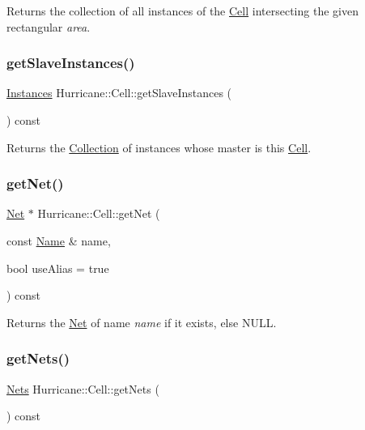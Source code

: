 Returns the collection of all instances of the \mbox{\hyperlink{classHurricane_1_1Cell}{Cell}} intersecting the given rectangular {\itshape area}. \mbox{\label{classHurricane_1_1Cell_a7e51bee5db73dd44f788e591a5c175c8}} 
\subsubsection{\texorpdfstring{get\+Slave\+Instances()}{getSlaveInstances()}}
{\footnotesize\ttfamily \mbox{\hyperlink{namespaceHurricane_ac9436b03a2926f34ad6863deae2baadc}{Instances}} Hurricane\+::\+Cell\+::get\+Slave\+Instances (\begin{DoxyParamCaption}{ }\end{DoxyParamCaption}) const}

Returns the \mbox{\hyperlink{classHurricane_1_1Collection}{Collection}} of instances whose master is this \mbox{\hyperlink{classHurricane_1_1Cell}{Cell}}. \mbox{\label{classHurricane_1_1Cell_a70f06abd224895aeeeeb042365dbf48a}} 
\subsubsection{\texorpdfstring{get\+Net()}{getNet()}}
{\footnotesize\ttfamily \mbox{\hyperlink{classHurricane_1_1Net}{Net}} $\ast$ Hurricane\+::\+Cell\+::get\+Net (\begin{DoxyParamCaption}\item[{const \mbox{\hyperlink{classHurricane_1_1Name}{Name}} \&}]{name,  }\item[{bool}]{use\+Alias = {\ttfamily true} }\end{DoxyParamCaption}) const}

Returns the \mbox{\hyperlink{classHurricane_1_1Net}{Net}} of name {\itshape name} if it exists, else {\ttfamily N\+U\+LL}. \mbox{\label{classHurricane_1_1Cell_a8b4728abe83e9ec21d7bee1154218279}} 
\subsubsection{\texorpdfstring{get\+Nets()}{getNets()}}
{\footnotesize\ttfamily \mbox{\hyperlink{namespaceHurricane_a3404a8b17130a1824f4a281704b04df7}{Nets}} Hurricane\+::\+Cell\+::get\+Nets (\begin{DoxyParamCaption}{ }\end{DoxyParamCaption}) const\hspace{0.3cm}{\ttfamily [inline]}}

